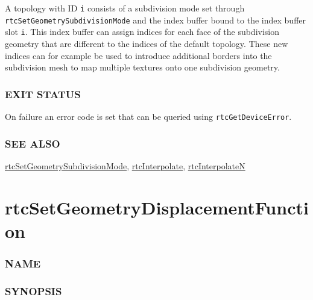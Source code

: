 A topology with ID \texttt{i} consists of a subdivision mode set through
\texttt{rtcSetGeometrySubdivisionMode} and the index buffer bound to the
index buffer slot \texttt{i}. This index buffer can assign indices for
each face of the subdivision geometry that are different to the indices
of the default topology. These new indices can for example be used to
introduce additional borders into the subdivision mesh to map multiple
textures onto one subdivision geometry.

\subsubsection{EXIT STATUS}\label{exit-status}

On failure an error code is set that can be queried using
\texttt{rtcGetDeviceError}.

\subsubsection{SEE ALSO}\label{see-also}

\hyperref[rtcsetgeometrysubdivisionmode]{rtcSetGeometrySubdivisionMode},
\hyperref[rtcinterpolate]{rtcInterpolate},
\hyperref[rtcinterpolaten]{rtcInterpolateN}

\pagebreak

\section{rtcSetGeometryDisplacementFunction}\label{rtcsetgeometrydisplacementfunction}

\subsubsection{NAME}\label{name}

\begin{Shaded}
\begin{Highlighting}[]
\OperatorTok{{-}}
\end{Highlighting}
\end{Shaded}

\subsubsection{SYNOPSIS}\label{synopsis}

